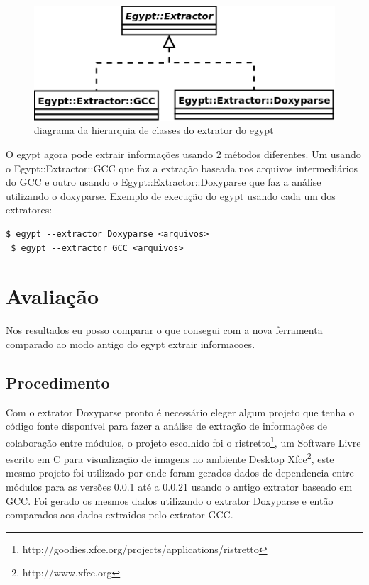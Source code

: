 \begin{figure}[h]
\center
\includegraphics[scale=0.5]{imagens/egypt-diagram-extractor}
\caption{diagrama da hierarquia de classes do extrator do egypt}
\label{egypt-diagram-extractor}
\end{figure}

O egypt agora pode extrair informações usando 2 métodos diferentes. Um usando o
Egypt::Extractor::GCC que faz a extração baseada nos arquivos intermediários do
GCC e outro usando o Egypt::Extractor::Doxyparse que faz a análise utilizando o
doxyparse. Exemplo de execução do egypt usando cada um dos extratores:

\begin{Verbatim}[frame=single,fontsize=\relsize{-2},fontfamily=courier]
 $ egypt --extractor Doxyparse <arquivos>
 $ egypt --extractor GCC <arquivos>
\end{Verbatim}

\chapter{Avaliação}

Nos resultados eu posso comparar o que consegui com a nova ferramenta comparado ao modo antigo do egypt extrair informacoes.

\section{Procedimento}

Com o extrator Doxyparse pronto é necessário eleger algum projeto que tenha o
código fonte disponível para fazer a análise de extração de informações de
colaboração entre módulos, o projeto escolhido foi o
ristretto\footnote{http://goodies.xfce.org/projects/applications/ristretto}, um
Software Livre escrito em C para visualização de imagens no ambiente Desktop
Xfce\footnote{http://www.xfce.org}, este mesmo projeto foi utilizado por
\cite{StructuralComplexityEvolution} onde foram gerados dados de dependencia
entre módulos para as versões 0.0.1 até a 0.0.21 usando o antigo
extrator baseado em GCC. Foi gerado os mesmos dados utilizando o extrator
Doxyparse e então comparados aos dados extraidos pelo extrator GCC.

